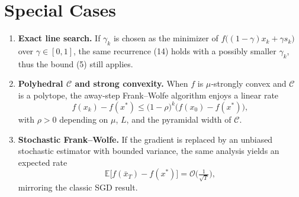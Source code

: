 \documentclass[11pt]{article}
\newcommand{\Cset}{\mathcal{C}}
\begin{document}
\section*{Special Cases}
\begin{enumerate}[label=\textbf{S\arabic*:}, leftmargin=*]
\item \textbf{Exact line search.}  
If $\gamma_{k}$ is chosen as the minimizer of $f\bigl((1-\gamma)x_{k}+\gamma s_{k}\bigr)$ over $\gamma\in[0,1]$, the same recurrence (14) holds with a possibly smaller $\gamma_{k}$, thus the bound (5) still applies.
\item \textbf{Polyhedral $\Cset$ and strong convexity.}  
When $f$ is $\mu$‑strongly convex and $\Cset$ is a polytope, the away‑step Frank–Wolfe algorithm enjoys a linear rate
\[
f(x_{k})-f(x^{*})\le \bigl(1-\rho\bigr)^{k}\bigl(f(x_{0})-f(x^{*})\bigr),
\]
with $\rho>0$ depending on $\mu$, $L$, and the pyramidal width of $\Cset$.
\item \textbf{Stochastic Frank–Wolfe.}  
If the gradient is replaced by an unbiased stochastic estimator with bounded variance, the same analysis yields an expected rate
\[
\mathbb{E}\bigl[f(\bar{x}_{T})-f(x^{*})\bigr]=\mathcal{O}\!\bigl(\tfrac{1}{\sqrt{T}}\bigr),
\]
mirroring the classic SGD result.
\end{enumerate}
\end{document}
